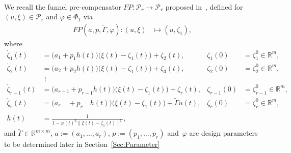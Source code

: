 \documentclass[ envcountsect, envcountsame]{svjour3}
\newcommand{\R}{\mathbb{R}}
\newcommand{\cP}{\mathcal{P}}
\newcommand{\cW}{\mathcal{W}}
\newcommand{\vp}{\varphi}
\newcommand{\rp}{\mathbb{R}_{\geq 0}}
\begin{document}
\ \\
%
%
We recall the funnel pre-compensator $FP : \cP_r \to \cP_{r} $ proposed in~\cite{BergReis18b}, defined for $(u,\xi) \in \cP_{r}$ and $\vp \in \Phi_1$ via
\begin{equation*}
\begin{aligned}
FP({a,p},\tilde \Gamma,\vp) : (u,\xi) &\mapsto (u,\zeta_1),
\end{aligned}
\end{equation*}
where
\begin{equation} \label{eq:FPC}
\begin{aligned}
%
\dot \zeta_1(t) & = \big(a_{1} + p_1 h(t) \big)\big( \xi(t) - \zeta_1(t) \big) + \zeta_{2}(t) ,  &\zeta_1(0) &= \zeta_1^0 \in \R^m, \\
\dot \zeta_{2}(t) & = \big(a_{2} + p_{2} h(t) \big)\big( \xi(t) - \zeta_1(t) \big) + \zeta_{3}(t) ,   &\zeta_{2}(0) &= \zeta_{2}^0 \in \R^m, \\
& \ \, \vdots & &\\
\dot \zeta_{r-1}(t) &= \big(a_{r-1} + p_{r-1} h(t) \big)\big(\xi(t) - \zeta_1(t) \big) +  \zeta_{r}(t),  &\zeta_{r-1}(0) &= \zeta_{r-1}^0 \in \R^m,  \\
\dot \zeta_{r}(t) &= \big(a_{r} \quad + p_{r} \quad h(t) \big)\big(\xi(t) - \zeta_1(t) \big) +  \tilde \Gamma u(t),  &\zeta_{r}(0) &= \zeta_{r}^0 \in \R^m, \\
\ \\
h(t) &= \frac{1}{1 - \vp(t)^2 \| \xi(t) - \zeta_1(t) \|^2} ,
\end{aligned}
\end{equation}
and $\tilde \Gamma  \in \R^{m \times m}$, {$a := (a_1,\ldots,a_r)$, $p := (p_1,\ldots,p_r)$} and~$\vp$ are design parameters to be determined later in Section~\ref{Sec:Parameter} 
%
\end{document}
